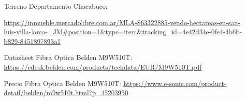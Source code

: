 \begin{thebibliography}{99}
Terreno Departamento Chacabuco: \begin{tiny}
\url{https://inmueble.mercadolibre.com.ar/MLA-863322885-vendo-hectareas-en-san-luis-villa-larca-_JM#position=1&type=item&tracking_id=4e42d34e-0fe4-4b6b-b829-8451897893a1}
\end{tiny}


 Datasheet Fibra Optica Belden M9W510T: {\tiny \url{https://edesk.belden.com/products/techdata/EUR/M9W510T.pdf}}


 Precio Fibra Optica Belden M9W510T: {\tiny \url{https://www.e-sonic.com/product-detail/belden/m9w510t.html?p=45203950}}

\end{thebibliography}

\newpage
